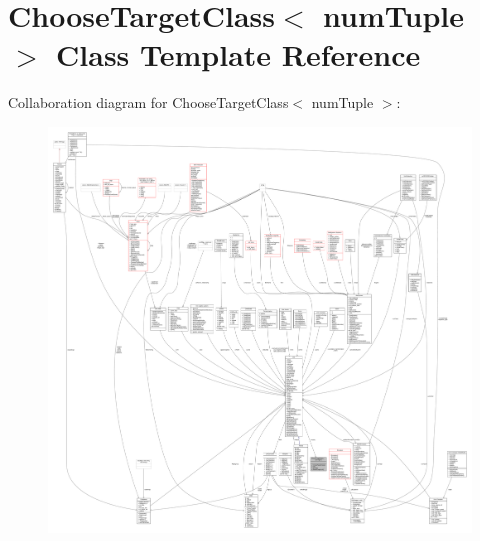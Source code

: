 \hypertarget{classChooseTargetClass}{}\section{Choose\+Target\+Class$<$ num\+Tuple $>$ Class Template Reference}
\label{classChooseTargetClass}


Collaboration diagram for Choose\+Target\+Class$<$ num\+Tuple $>$\+:
\nopagebreak
\begin{figure}[H]
\begin{center}
\leavevmode
\includegraphics[width=350pt]{db/da3/classChooseTargetClass__coll__graph}
\end{center}
\end{figure}
